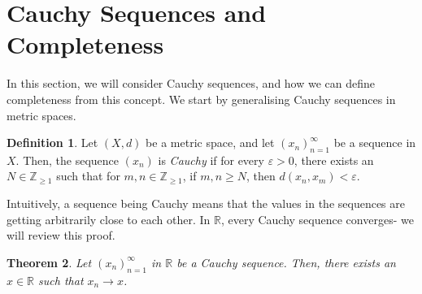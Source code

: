 \documentclass[a4paper, openany]{memoir}
\theoremstyle{definition}
\newtheorem{definition}{Definition}[section]
\theoremstyle{plain}
\newtheorem{theorem}[definition]{Theorem}
\begin{document}
\section{Cauchy Sequences and Completeness}
In this section, we will consider Cauchy sequences, and how we can define completeness from this concept. We start by generalising Cauchy sequences in metric spaces.
\begin{definition}
Let $(X, d)$ be a metric space, and let $(x_n)_{n=1}^{\infty}$ be a sequence in $X$. Then, the sequence $(x_n)$ is \emph{Cauchy} if for every $\varepsilon > 0$, there exists an $N \in \mathbb{Z}_{\geqslant 1}$ such that for $m, n \in \mathbb{Z}_{\geqslant 1}$, if $m, n \geqslant N$, then $d(x_n, x_m) < \varepsilon$.
\end{definition}
\noindent Intuitively, a sequence being Cauchy means that the values in the sequences are getting arbitrarily close to each other. In $\mathbb{R}$, every Cauchy sequence converges- we will review this proof.
\begin{theorem}
Let $(x_n)_{n=1}^{\infty}$ in $\mathbb{R}$ be a Cauchy sequence. Then, there exists an $x \in \mathbb{R}$ such that $x_n \to x$.
\end{theorem}
\end{document}
